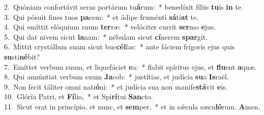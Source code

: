 {2.~}Quóniam confortávit seras portárum tu\textbf{á}rum:~* benedíxit fíliis \textbf{tu}is \textbf{in} te.\\
{3.~}Qui pósuit fines tuos \textbf{pa}cem:~* et ádipe fruménti \textbf{sá}ti\textbf{at} te.\\
{4.~}Qui emíttit elóquium suum \textbf{ter}ræ:~* velóciter currit \textbf{ser}mo \textbf{e}jus.\\
{5.~}Qui dat nivem sicut \textbf{la}nam:~* nébulam sicut \textbf{cí}nerem \textbf{spar}git.\\
{6.~}Mittit crystállum suam sicut buc\textbf{cél}las:~* ante fáciem frígoris ejus quis \textbf{su}sti\textbf{né}bit?\\
{7.~}Emíttet verbum suum, et liquefáciet \textbf{e}a:~* flabit spíritus ejus, et \textbf{flu}ent \textbf{a}quæ.\\
{8.~}Qui annúntiat verbum suum \textbf{Ja}cob:~* justítias, et judícia \textbf{su}a \textbf{Is}raël.\\
{9.~}Non fecit táliter omni nati\textbf{ó}ni:~* et judícia sua non manife\textbf{stá}vit \textbf{e}is.\\
{10.~}Glória Patri, et \textbf{Fí}lio,~* et Spi\textbf{rí}tui \textbf{San}cto.\\
{11.~}Sicut erat in princípio, et nunc, et \textbf{sem}per,~* et in sǽcula sæcu\textbf{ló}rum. \textbf{A}men.\\
